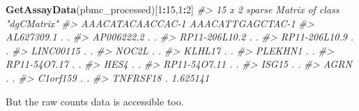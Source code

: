 \documentclass[
]{book}
\newenvironment{Shaded}{\begin{snugshade}}{\end{snugshade}}
\newcommand{\CommentTok}[1]{\textcolor[rgb]{0.56,0.35,0.01}{\textit{#1}}}
\newcommand{\DecValTok}[1]{\textcolor[rgb]{0.00,0.00,0.81}{#1}}
\newcommand{\FunctionTok}[1]{\textcolor[rgb]{0.13,0.29,0.53}{\textbf{#1}}}
\newcommand{\NormalTok}[1]{#1}
\newcommand{\SpecialCharTok}[1]{\textcolor[rgb]{0.81,0.36,0.00}{\textbf{#1}}}
\begin{document}
\begin{Shaded}
\begin{Highlighting}[]
\FunctionTok{GetAssayData}\NormalTok{(pbmc\_processed)[}\DecValTok{1}\SpecialCharTok{:}\DecValTok{15}\NormalTok{,}\DecValTok{1}\SpecialCharTok{:}\DecValTok{2}\NormalTok{]}
\CommentTok{\#\textgreater{} 15 x 2 sparse Matrix of class "dgCMatrix"}
\CommentTok{\#\textgreater{}               AAACATACAACCAC{-}1 AAACATTGAGCTAC{-}1}
\CommentTok{\#\textgreater{} AL627309.1                   .         .       }
\CommentTok{\#\textgreater{} AP006222.2                   .         .       }
\CommentTok{\#\textgreater{} RP11{-}206L10.2                .         .       }
\CommentTok{\#\textgreater{} RP11{-}206L10.9                .         .       }
\CommentTok{\#\textgreater{} LINC00115                    .         .       }
\CommentTok{\#\textgreater{} NOC2L                        .         .       }
\CommentTok{\#\textgreater{} KLHL17                       .         .       }
\CommentTok{\#\textgreater{} PLEKHN1                      .         .       }
\CommentTok{\#\textgreater{} RP11{-}54O7.17                 .         .       }
\CommentTok{\#\textgreater{} HES4                         .         .       }
\CommentTok{\#\textgreater{} RP11{-}54O7.11                 .         .       }
\CommentTok{\#\textgreater{} ISG15                        .         .       }
\CommentTok{\#\textgreater{} AGRN                         .         .       }
\CommentTok{\#\textgreater{} C1orf159                     .         .       }
\CommentTok{\#\textgreater{} TNFRSF18                     .         1.625141}
\end{Highlighting}
\end{Shaded}

But the raw counts data is accessible too.
\end{document}
